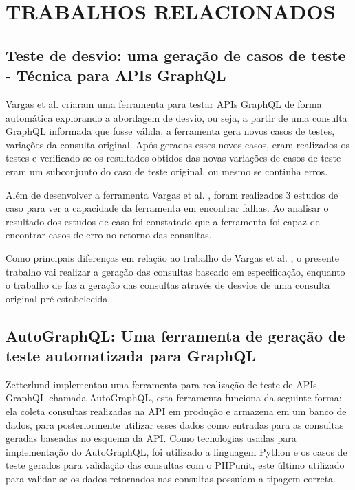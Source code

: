 \chapter{TRABALHOS RELACIONADOS}
\label{chap:relacionados}
\section{Teste de desvio: uma geração de casos de teste - Técnica para APIs GraphQL}

Vargas et al. \cite{vargas2018} criaram uma ferramenta para testar APIs GraphQL de forma automática explorando a abordagem de desvio, ou seja, a partir de uma consulta GraphQL informada que fosse válida, a ferramenta gera novos casos de testes, variações da consulta original. Após gerados esses novos casos, eram realizados os testes e verificado se os resultados obtidos das novas variações de casos de teste eram um subconjunto do caso de teste original, ou mesmo se continha erros.

Além de desenvolver a ferramenta Vargas et al. \cite{vargas2018}, foram realizados 3 estudos de caso para ver a capacidade da ferramenta em encontrar falhas. Ao analisar o resultado dos estudos de caso foi constatado que a ferramenta foi capaz de encontrar casos de erro no retorno das consultas.

Como principais diferenças em relação ao trabalho de Vargas et al. \cite{vargas2018}, o presente trabalho vai realizar a geração das consultas baseado em especificação, enquanto o trabalho de \cite{vargas2018} faz a geração das consultas através de desvios de uma consulta original pré-estabelecida.

\section{AutoGraphQL: Uma ferramenta de geração de teste automatizada para GraphQL}
Zetterlund \cite{zetterlund2021} implementou uma ferramenta para realização de teste de APIs GraphQL chamada AutoGraphQL, esta ferramenta funciona da seguinte forma: ela coleta consultas realizadas na API em produção e armazena em um banco de dados, para posteriormente utilizar esses dados como entradas para as consultas geradas baseadas no esquema da API. Como tecnologias usadas para implementação do AutoGraphQL, foi utilizado a linguagem Python e os casos de teste gerados para validação das consultas com o PHPunit, este último utilizado para validar se os dados retornados nas consultas possuíam a tipagem correta.

